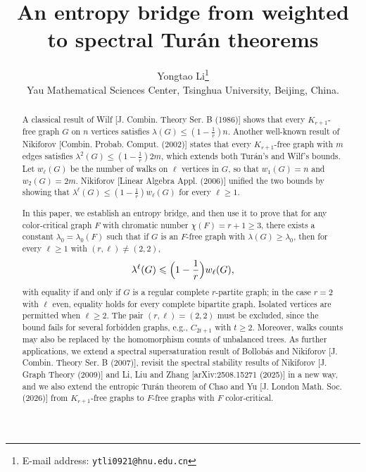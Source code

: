 \documentclass[11pt, a4paper]{article}
\title{An entropy bridge from weighted to spectral Tur\'{a}n theorems}
\author{Yongtao Li\thanks{E-mail address: \texttt{ytli0921@hnu.edu.cn} }  \\[2mm]
{\small Yau Mathematical Sciences Center, Tsinghua University, Beijing, China.} 
 }
\date{}
\theoremstyle{definition}
\theoremstyle{plain}
\renewcommand{\le}{\leqslant}
\renewcommand{\ge}{\geqslant}
\begin{document}
\maketitle

\vspace{-0.4cm}

\begin{abstract}
A classical result of Wilf [J. Combin. Theory Ser. B (1986)] shows that every $K_{r+1}$-free graph $G$ on $n$ vertices satisfies $\lambda (G)\le (1- \frac{1}{r}) n$. Another well-known result of Nikiforov [Combin. Probab. Comput. (2002)] states that every $K_{r+1}$-free graph with $m$ edges satisfies $\lambda^2(G)\le (1-\frac{1}{r}) 2m$, which extends both Tur\'{a}n's   and Wilf's bounds. 
Let $w_\ell(G)$ be the number of walks on $\ell$ vertices in $G$, so that $w_1(G)=n$ and $w_2(G)=2m$. Nikiforov [Linear Algebra Appl. (2006)] unified the two bounds by showing that $\lambda^{\ell}(G)\le (1- \frac{1}{r}) w_{\ell}(G)$ for every $\ell \ge 1$. 


In this paper, we establish an entropy bridge, and then use it to prove that for any color-critical graph $F$ with chromatic number $\chi(F)=r+1\ge 3$, there exists a constant $\lambda_0=\lambda_0(F)$ such that if $G$ is an $F$-free graph with $\lambda (G)\ge \lambda_0$, then for every $\ell\ge 1$ with $(r,\ell )\neq (2,2)$, 
\vspace{-1.5mm}
\[ \lambda^\ell (G) \le
  \Big(1-\frac1r\Big)w_\ell(G), \vspace{-1mm} \]
with equality if and only if $G$ is a regular complete $r$-partite graph; in the case $r=2$ with $\ell$ even, equality holds for every complete bipartite graph. Isolated vertices are permitted when $\ell \ge 2$. 
The pair $(r,\ell )=(2,2)$ must be excluded, since the bound fails for several forbidden graphs, e.g., $C_{2t+1}$ with $t\ge 2$. Moreover,  walks counts may also be replaced by the homomorphism counts of unbalanced trees. 
As further applications,  we extend a spectral supersaturation result of Bollob\'{a}s and Nikiforov [J. Combin. Theory Ser. B (2007)],  revisit the spectral stability results of Nikiforov [J. Graph Theory (2009)] and Li, Liu and Zhang [arXiv:2508.15271 (2025)] in a new way, 
and we also extend the entropic Tur\'{a}n theorem of Chao and Yu [J. London Math. Soc. (2026)] from $K_{r+1}$-free graphs to $F$-free graphs with $F$ color-critical. 


\end{abstract}
\end{document}
